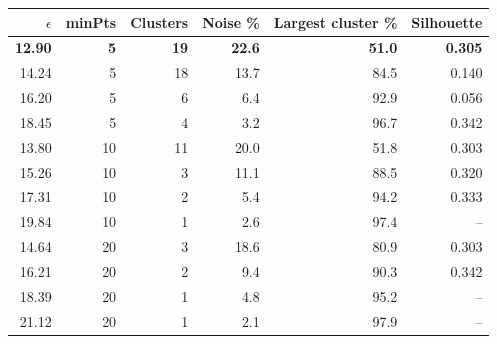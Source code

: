\documentclass[12pt,a4paper]{article}
\begin{document}
\begin{center}
\small
\begin{tabular}{rrrrrr}
\toprule
$\epsilon$ & minPts & Clusters & Noise \% & Largest cluster \% & Silhouette \\
\midrule
\textbf{12.90} & \textbf{5} & \textbf{19} & \textbf{22.6} & \textbf{51.0} & \textbf{0.305} \\
14.24 & 5 & 18 & 13.7 & 84.5 & 0.140 \\
16.20 & 5 & 6 & 6.4 & 92.9 & 0.056 \\
18.45 & 5 & 4 & 3.2 & 96.7 & 0.342 \\
13.80 & 10 & 11 & 20.0 & 51.8 & 0.303 \\
15.26 & 10 & 3 & 11.1 & 88.5 & 0.320 \\
17.31 & 10 & 2 & 5.4 & 94.2 & 0.333 \\
19.84 & 10 & 1 & 2.6 & 97.4 & -- \\
14.64 & 20 & 3 & 18.6 & 80.9 & 0.303 \\
16.21 & 20 & 2 & 9.4 & 90.3 & 0.342 \\
18.39 & 20 & 1 & 4.8 & 95.2 & -- \\
21.12 & 20 & 1 & 2.1 & 97.9 & -- \\
\bottomrule
\end{tabular}
\end{center}

\end{document}
